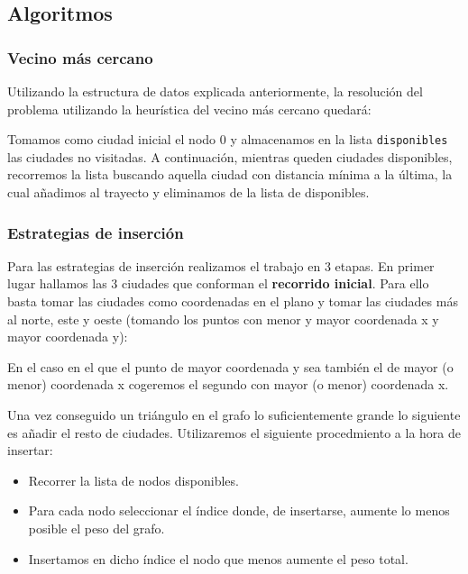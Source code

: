 \subsection{Algoritmos}

\subsubsection{Vecino más cercano}

Utilizando la estructura de datos explicada anteriormente, la resolución del problema
utilizando la heurística del vecino más cercano quedará:



Tomamos como ciudad inicial el nodo 0 y almacenamos en la lista \texttt{disponibles}
las ciudades no visitadas. A continuación, mientras queden ciudades disponibles,
recorremos la lista buscando aquella ciudad con distancia mínima a la última, la
cual añadimos al trayecto y eliminamos de la lista de disponibles.

\subsubsection{Estrategias de inserción}

Para las estrategias de inserción realizamos el trabajo en 3 etapas.
En primer lugar hallamos las 3 ciudades que conforman el \textbf{recorrido inicial}.
Para ello basta tomar las ciudades como coordenadas en el plano y tomar las ciudades
más al norte, este y oeste (tomando los puntos con menor y mayor coordenada x y mayor
coordenada y):



En el caso en el que el punto de mayor coordenada y sea también el de mayor (o menor)
coordenada x cogeremos el segundo con mayor (o menor) coordenada x.

Una vez conseguido un triángulo en el grafo lo suficientemente grande lo siguiente es añadir el resto de ciudades. Utilizaremos el siguiente procedmiento a la hora de insertar:

\begin{itemize}
  \item Recorrer la lista de nodos disponibles.
  \item Para cada nodo seleccionar el índice donde, de insertarse, aumente lo menos posible el peso del grafo.
  \item Insertamos en dicho índice el nodo que menos aumente el peso total.
\end{itemize}

